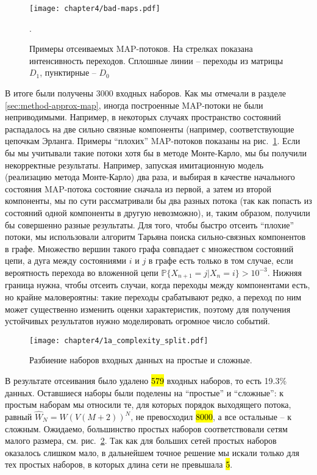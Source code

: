 \begin{figure}[h]
    \texttt{[image: chapter4/bad-maps.pdf]}
    \caption{Примеры отсеиваемых MAP-потоков. На стрелках показана интенсивность переходов. Сплошные линии -- переходы из матрицы $D_1$, пунктирные -- $D_0$}.\label{fig:results-approx-bad-maps}
\end{figure}

В итоге были получены 3000 входных наборов. Как мы отмечали в разделе \ref{sec:method-approx-map}, иногда построенные MAP-потоки не были неприводимыми. Например, в некоторых случаях пространство состояний распадалось на две сильно связные компоненты (например, соответствующие цепочкам Эрланга. Примеры ``плохих'' MAP-потоков показаны на рис.~\ref{fig:results-approx-bad-maps}. Если бы мы учитывали такие потоки хотя бы в методе Монте-Карло, мы бы получили некорректные результаты. Например, запуская имитационную модель (реализацию метода Монте-Карло) два раза, и выбирая в качестве начального состояния MAP-потока состояние сначала из первой, а затем из второй компоненты, мы по сути рассматривали бы два разных потока (так как попасть из состояний одной компоненты в другую невозможно), и, таким образом, получили бы совершенно разные результаты. Для того, чтобы быстро отсеить ``плохие'' потоки, мы использовали алгоритм Тарьяна поиска сильно-связных компонентов в графе. Множество вершин такого графа совпадает с множеством состояний цепи, а дуга между состояниями $i$ и $j$ в графе есть только в том случае, если вероятность перехода во вложенной цепи $\mathbb{P}\{X_{n+1} = j | X_n = i\} > 10^{-3}$. Нижняя граница нужна, чтобы отсеить случаи, когда переходы между компонентами есть, но крайне маловероятны: такие переходы срабатывают редко, а переход по ним может существенно изменить оценки характеристик, поэтому для получения устойчивых результатов нужно моделировать огромное число событий.

\begin{figure}[h]
    \texttt{[image: chapter4/1a\_complexity\_split.pdf]}
    \caption{Разбиение наборов входных данных на простые и сложные.}\label{fig:results-approx-complexity-split}
\end{figure}

В результате отсеивания было удалено \hl{579} входных наборов, то есть 19.3\% данных. Оставшиеся наборы были поделены на ``простые'' и ``сложные'': к простым наборам мы относили те, для которых порядок выходящего потока, равный $\hat{W}_N = W(V(M+2))^N$, не превосходил \hl{8000}, а все остальные -- к сложным. Ожидаемо, большинство простых наборов соответствовали сетям малого размера, см. рис.~\ref{fig:results-approx-complexity-split}. Так как для больших сетей простых наборов оказалось слишком мало, в дальнейшем точное решение мы искали только для тех простых наборов, в которых длина сети не превышала \hl{5}.

